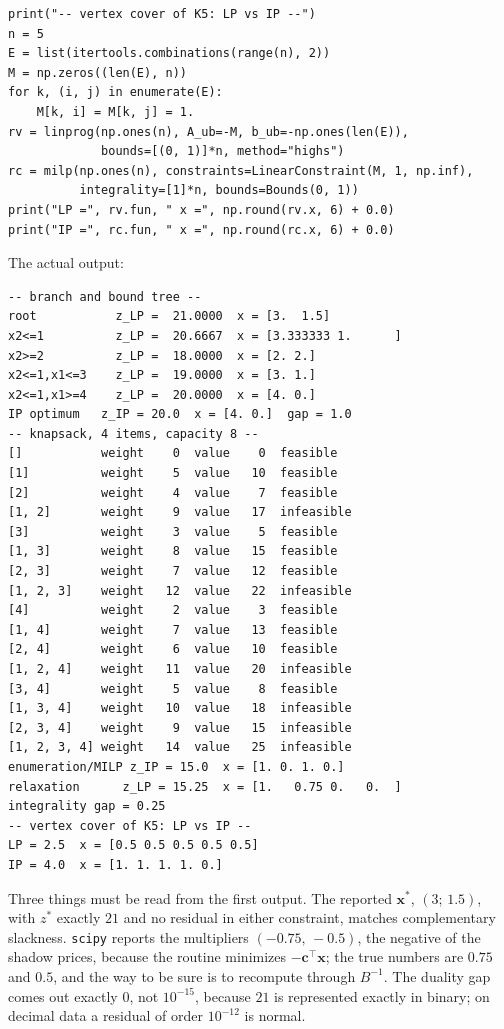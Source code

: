 \begin{lab}
\begin{verbatim}
print("-- vertex cover of K5: LP vs IP --")
n = 5
E = list(itertools.combinations(range(n), 2))
M = np.zeros((len(E), n))
for k, (i, j) in enumerate(E):
    M[k, i] = M[k, j] = 1.
rv = linprog(np.ones(n), A_ub=-M, b_ub=-np.ones(len(E)),
             bounds=[(0, 1)]*n, method="highs")
rc = milp(np.ones(n), constraints=LinearConstraint(M, 1, np.inf),
          integrality=[1]*n, bounds=Bounds(0, 1))
print("LP =", rv.fun, " x =", np.round(rv.x, 6) + 0.0)
print("IP =", rc.fun, " x =", np.round(rc.x, 6) + 0.0)
\end{verbatim}
The actual output:
\begin{verbatim}
-- branch and bound tree --
root           z_LP =  21.0000  x = [3.  1.5]
x2<=1          z_LP =  20.6667  x = [3.333333 1.      ]
x2>=2          z_LP =  18.0000  x = [2. 2.]
x2<=1,x1<=3    z_LP =  19.0000  x = [3. 1.]
x2<=1,x1>=4    z_LP =  20.0000  x = [4. 0.]
IP optimum   z_IP = 20.0  x = [4. 0.]  gap = 1.0
-- knapsack, 4 items, capacity 8 --
[]           weight    0  value    0  feasible
[1]          weight    5  value   10  feasible
[2]          weight    4  value    7  feasible
[1, 2]       weight    9  value   17  infeasible
[3]          weight    3  value    5  feasible
[1, 3]       weight    8  value   15  feasible
[2, 3]       weight    7  value   12  feasible
[1, 2, 3]    weight   12  value   22  infeasible
[4]          weight    2  value    3  feasible
[1, 4]       weight    7  value   13  feasible
[2, 4]       weight    6  value   10  feasible
[1, 2, 4]    weight   11  value   20  infeasible
[3, 4]       weight    5  value    8  feasible
[1, 3, 4]    weight   10  value   18  infeasible
[2, 3, 4]    weight    9  value   15  infeasible
[1, 2, 3, 4] weight   14  value   25  infeasible
enumeration/MILP z_IP = 15.0  x = [1. 0. 1. 0.]
relaxation      z_LP = 15.25  x = [1.   0.75 0.   0.  ]
integrality gap = 0.25
-- vertex cover of K5: LP vs IP --
LP = 2.5  x = [0.5 0.5 0.5 0.5 0.5]
IP = 4.0  x = [1. 1. 1. 1. 0.]
\end{verbatim}
\end{lab}

Three things must be read from the first output. The reported $\mathbf{x}^{*}$,
$(3;\,1.5)$, with $z^{*}$ exactly $21$ and no residual in either constraint, matches
complementary slackness. \texttt{scipy} reports the multipliers $(-0.75,\,-0.5)$, the negative
of the shadow prices, because the routine minimizes $-\mathbf{c}^{\top}\mathbf{x}$; the true
numbers are $0.75$ and $0.5$, and the way to be sure is to recompute through $B^{-1}$. The
duality gap comes out exactly $0$, not $10^{-15}$, because $21$ is represented exactly in
binary; on decimal data a residual of order $10^{-12}$ is normal.

